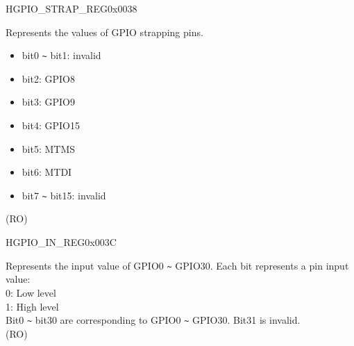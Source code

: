 \begin{register}{H}{GPIO\_STRAP\_REG}{0x0038}\label{regdesc:GPIOSTRAPREG}
%
%
\regnewline%
\begin{regdesc}\begin{reglist}
\label{fielddesc:GPIOSTRAPPING}\item [GPIO\_STRAPPING] Represents the values of GPIO strapping pins. 
\begin{itemize}
    \item bit0 \verb+~+ bit1: invalid
    \item bit2: GPIO8
    \item bit3: GPIO9
    \item bit4: GPIO15
    \item bit5: MTMS
    \item bit6: MTDI
    \item bit7 \verb+~+ bit15: invalid
\end{itemize}
(RO)
\end{reglist}\end{regdesc}
\end{register}


\begin{register}{H}{GPIO\_IN\_REG}{0x003C}\label{regdesc:GPIOINREG}
%
\regnewline%
\begin{regdesc}\begin{reglist}
\label{fielddesc:GPIOINDATANEXT}\item [GPIO\_IN\_DATA\_NEXT] Represents the input value of GPIO0 \verb+~+ GPIO30. Each bit represents a pin input value:\\
0: Low level\\
1: High level\\
Bit0 \verb+~+ bit30 are corresponding to GPIO0 \verb+~+ GPIO30. Bit31 is invalid.\\
(RO)
\end{reglist}\end{regdesc}
\end{register}


